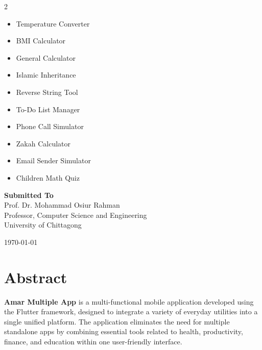 \documentclass{article}
\begin{document}
\begin{titlepage}
\begin{center}
\begin{tcolorbox}[
colback=softblue,
colframe=primary,
width=0.7\textwidth,
arc=6pt
]
\begin{multicols}{2}
\begin{itemize}
\item Temperature Converter
\item BMI Calculator
\item General Calculator
\item Islamic Inheritance
\item Reverse String Tool
\item To-Do List Manager
\item Phone Call Simulator
\item Zakah Calculator
\item Email Sender Simulator
\item Children Math Quiz
\end{itemize}
\end{multicols}

\end{tcolorbox}
\vfill

\textbf{Submitted To}\\
Prof. Dr. Mohammad Osiur Rahman\\
Professor, Computer Science and Engineering\\ 
University of Chittagong

\vspace{0.5cm}

\today

\end{center}

\end{titlepage}


\tableofcontents


\listoffigures


\listoftables
\newpage




\section*{Abstract}

\begin{reportbox}[Overview]
\textbf{Amar Multiple App} is a multi-functional mobile application developed using the Flutter framework, designed to integrate a variety of everyday utilities into a single unified platform. The application eliminates the need for multiple standalone apps by combining essential tools related to health, productivity, finance, and education within one user-friendly interface.
\end{reportbox}
\end{document}
